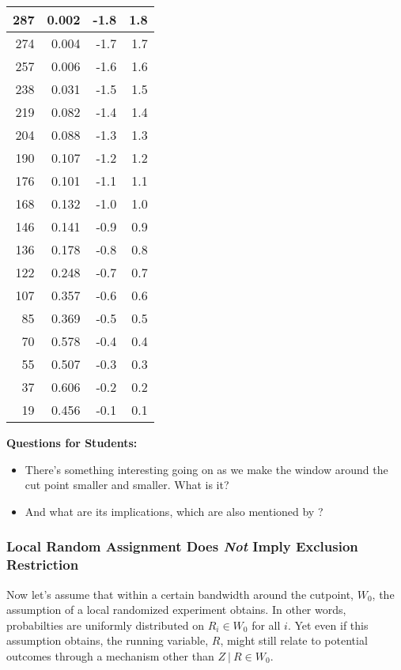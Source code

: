 \documentclass[11pt,leqno]{article}\usepackage[]{graphicx}\usepackage[]{color}
\newenvironment{knitrout}{}{} %
\newcommand\given[1][]{\:#1\vert\:}
\theoremstyle{newstyle}
\begin{document}
\begin{knitrout}
\begin{tabular}{r|r|r|r}
\hline
287 & 0.002 & -1.8 & 1.8\\
\hline
274 & 0.004 & -1.7 & 1.7\\
\hline
257 & 0.006 & -1.6 & 1.6\\
\hline
238 & 0.031 & -1.5 & 1.5\\
\hline
219 & 0.082 & -1.4 & 1.4\\
\hline
204 & 0.088 & -1.3 & 1.3\\
\hline
190 & 0.107 & -1.2 & 1.2\\
\hline
176 & 0.101 & -1.1 & 1.1\\
\hline
168 & 0.132 & -1.0 & 1.0\\
\hline
146 & 0.141 & -0.9 & 0.9\\
\hline
136 & 0.178 & -0.8 & 0.8\\
\hline
122 & 0.248 & -0.7 & 0.7\\
\hline
107 & 0.357 & -0.6 & 0.6\\
\hline
85 & 0.369 & -0.5 & 0.5\\
\hline
70 & 0.578 & -0.4 & 0.4\\
\hline
55 & 0.507 & -0.3 & 0.3\\
\hline
37 & 0.606 & -0.2 & 0.2\\
\hline
19 & 0.456 & -0.1 & 0.1\\
\hline
\end{tabular}


\end{knitrout}

\vspace{5mm}
\textbf{Questions for Students:}
\vspace{-5mm}
\begin{itemize}\itemsep1pt
\item There's something interesting going on as we make the window around the cut point smaller and smaller. What is it?
\item And what are its implications, which are also mentioned by \citet{caugheysekhon2011}?
\end{itemize}

\subsubsection{Local Random Assignment Does \textit{Not} Imply Exclusion Restriction}

Now let's assume that within a certain bandwidth around the cutpoint, $W_0$, the assumption of a local randomized experiment obtains. In other words, probabilties are uniformly distributed on $R_i \in W_0$ for all $i$. Yet even if this assumption obtains, the running variable, $R$, might still relate to potential outcomes through a mechanism other than $Z \given R \in W_0$.
\end{document}
